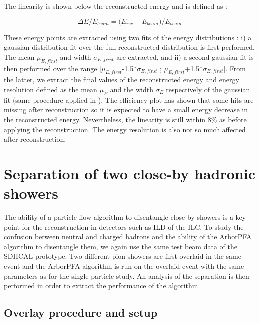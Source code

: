 \documentclass[cits]{JINST}
\begin{document}
The linearity is shown below the reconstructed energy and is defined as :

\begin{equation}
  \Delta E/E_{beam} = \Big(E_{rec} - E_{beam}\Big)/E_{beam}
\end{equation}

These energy points are extracted using two fits of the energy distributions : i) a gaussian distribution fit over the full reconstructed distribution is first performed. The mean $\mu_{E,first}$ and width $\sigma_{E,first}$ are extracted, and ii) a second gaussian fit is then performed over the range [$\mu_{E,first}$-1.5*$\sigma_{E,first}$ ; $\mu_{E,first}$+1.5*$\sigma_{E,first}$]. From the latter, we extract the final values of the reconstructed energy and energy resolution defined as the mean $\mu_E$ and the width $\sigma_E$ respectively of the gaussian fit (same procedure applied in \cite{sdhcal-paper}). The efficiency plot has shown that some hits are missing after reconstruction so it is expected to have a small energy decrease in the reconstructed energy. Nevertheless, the linearity is still within 8\% as before applying the reconstruction. The energy resolution is also not so much affected after reconstruction.

\newpage
\section{Separation of two close-by hadronic showers}

The ability of a particle flow algorithm to disentangle close-by showers is a key point for the reconstruction in detectors such as ILD of the ILC. To study the confusion between neutral and charged hadrons and the ability of the ArborPFA algorithm to disentangle them, we again use the same test beam data of the SDHCAL prototype. Two different pion showers are first overlaid in the same event and the ArborPFA algorithm is run on the overlaid event with the same parameters as for the single particle study. An analysis of the separation is then performed in order to extract the performance of the algorithm.

\subsection{Overlay procedure and setup}
\end{document}
